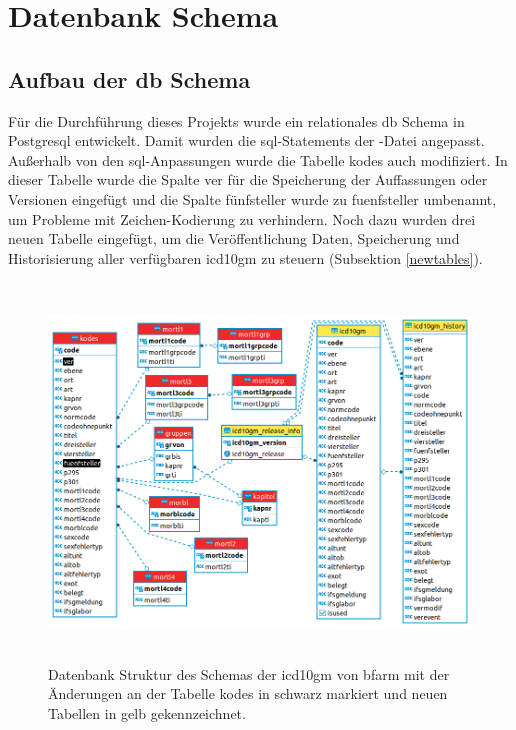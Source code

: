 \section{Datenbank Schema} \label{database}

\subsection{Aufbau der \acl{db} Schema} \label{dbdevelop}

Für die Durchführung dieses Projekts wurde ein relationales \ac{db} Schema in Postgresql entwickelt. Damit wurden die \ac{sql}-Statements der \grqq-Datei angepasst. Außerhalb von den \ac{sql}-Anpassungen wurde die Tabelle {\ttfamily kodes} auch modifiziert. In dieser Tabelle wurde die Spalte {\ttfamily ver} für die Speicherung der Auffassungen oder Versionen eingefügt und die Spalte {\ttfamily fünfsteller} wurde zu {\ttfamily fuenfsteller} umbenannt, um Probleme mit Zeichen-Kodierung zu verhindern. Noch dazu wurden drei neuen Tabelle eingefügt, um die Veröffentlichung Daten, Speicherung und Historisierung aller verfügbaren \ac{icd10gm} zu steuern (Subsektion \ref{newtables}).
	
	\begin{figure}[ht]
		\centering
		\includegraphics[height=10cm]{figures/icdSqlSchemaNew}
		\caption[Vorschlag der Datenbank Struktur von \acs{icd10gm}]{Datenbank Struktur des Schemas der \ac{icd10gm} von \ac{bfarm} mit der Änderungen an der Tabelle {\ttfamily kodes} in schwarz markiert und neuen Tabellen in gelb gekennzeichnet.}
		\label{fig:reldb2}
	\end{figure}
